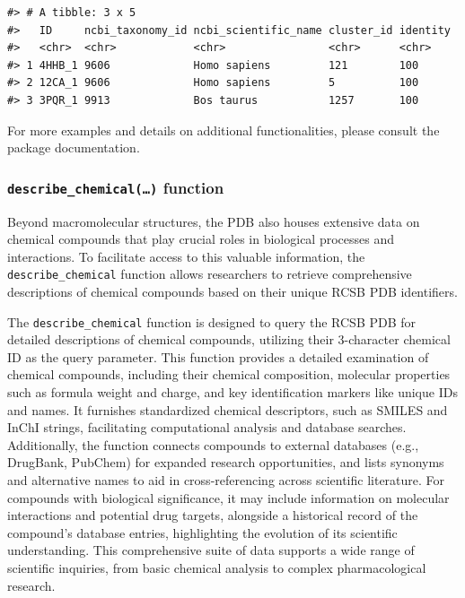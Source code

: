 \begin{verbatim}
#> # A tibble: 3 x 5
#>   ID     ncbi_taxonomy_id ncbi_scientific_name cluster_id identity
#>   <chr>  <chr>            <chr>                <chr>      <chr>   
#> 1 4HHB_1 9606             Homo sapiens         121        100     
#> 2 12CA_1 9606             Homo sapiens         5          100     
#> 3 3PQR_1 9913             Bos taurus           1257       100
\end{verbatim}

For more examples and details on additional functionalities, please consult the package documentation.

\subsubsection{\texorpdfstring{\texttt{describe\_chemical(…)} function}{describe\_chemical(\ldots) function}}\label{describe_chemical-function}

Beyond macromolecular structures, the PDB also houses extensive data on chemical compounds that play crucial roles in biological processes and interactions. To facilitate access to this valuable information, the \texttt{describe\_chemical} function allows researchers to retrieve comprehensive descriptions of chemical compounds based on their unique RCSB PDB identifiers.

The \texttt{describe\_chemical} function is designed to query the RCSB PDB for detailed descriptions of chemical compounds, utilizing their 3-character chemical ID as the query parameter. This function provides a detailed examination of chemical compounds, including their chemical composition, molecular properties such as formula weight and charge, and key identification markers like unique IDs and names. It furnishes standardized chemical descriptors, such as SMILES and InChI strings, facilitating computational analysis and database searches. Additionally, the function connects compounds to external databases (e.g., DrugBank, PubChem) for expanded research opportunities, and lists synonyms and alternative names to aid in cross-referencing across scientific literature. For compounds with biological significance, it may include information on molecular interactions and potential drug targets, alongside a historical record of the compound's database entries, highlighting the evolution of its scientific understanding. This comprehensive suite of data supports a wide range of scientific inquiries, from basic chemical analysis to complex pharmacological research.

